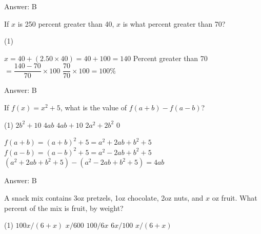 \documentclass[11pt,paper=a4,answers]{exam}
\begin{document}
\begin{questions}
\begin{solution}
Answer: \colorbox{yellow!100}{B}
\end{solution}

\vspace{1cm}

\question
If $x$ is 250 percent greater than 40, $x$ is what percent greater than 70?

\begin{tasks}(1)
\end{tasks}

\begin{solution}
\begin{center}
$x = 40 + (2.50 \times 40) = 40 + 100 = 140$
\vspace{5pt}
Percent greater than 70 $= \dfrac{140 - 70}{70} \times 100$
\vspace{5pt}
$\dfrac{70}{70} \times 100 = 100\%$
\end{center}

Answer: \colorbox{yellow!100}{B}
\end{solution}

\vspace{1cm}

\question
If $f(x) = x^2 + 5$, what is the value of $f(a+b) - f(a-b)$?

\begin{tasks}(1)
\task[A)] $2b^2 + 10$ \task[B)] $4ab$ \task[C)] $4ab + 10$ \task[D)] $2a^2 + 2b^2$ \task[E)] $0$
\end{tasks}

\begin{solution}
\begin{center}
$f(a+b) = (a+b)^2 + 5 = a^2 + 2ab + b^2 + 5$
\vspace{5pt}
$f(a-b) = (a-b)^2 + 5 = a^2 - 2ab + b^2 + 5$
\vspace{5pt}
$(a^2 + 2ab + b^2 + 5) - (a^2 - 2ab + b^2 + 5) = 4ab$
\end{center}

Answer: \colorbox{yellow!100}{B}
\end{solution}

\vspace{1cm}

\question
A snack mix contains 3oz pretzels, 1oz chocolate, 2oz nuts, and $x$ oz fruit. What percent of the mix is fruit, by weight?

\begin{tasks}(1)
\task[A)] $100x / (6+x)$ \task[B)] $x/600$ \task[C)] $100/6x$ \task[D)] $6x/100$ \task[E)] $x / (6+x)$
\end{tasks}


\end{questions}
\end{document}
